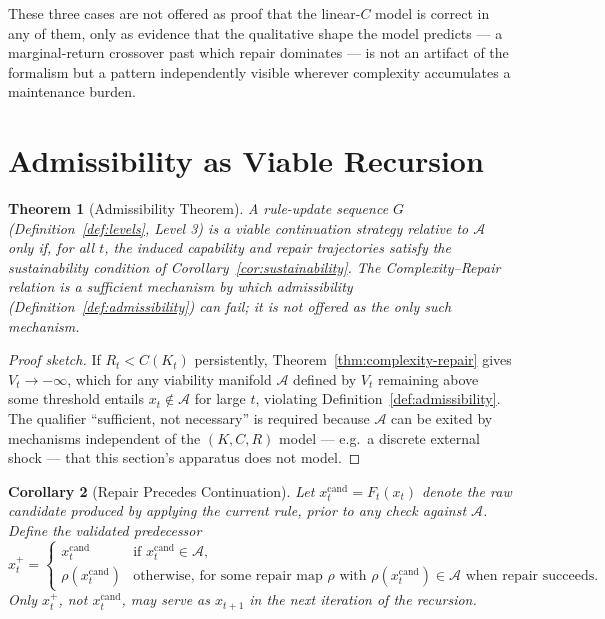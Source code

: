 \documentclass[11pt,a4paper]{article}
\theoremstyle{plain}
\newtheorem{theorem}{Theorem}[section]
\newtheorem{corollary}[theorem]{Corollary}
\theoremstyle{definition}
\theoremstyle{remark}
\newcommand{\Adm}{\mathcal{A}}
\begin{document}
These three cases are not offered as proof that the linear-$C$ model is correct in any of them, only as evidence that the qualitative shape the model predicts — a marginal-return crossover past which repair dominates — is not an artifact of the formalism but a pattern independently visible wherever complexity accumulates a maintenance burden.

\section{Admissibility as Viable Recursion}
\label{sec:admissibility-viable}

\begin{theorem}[Admissibility Theorem]
\label{thm:admissibility}
A rule-update sequence $G$ (Definition~\ref{def:levels}, Level 3) is a viable continuation strategy relative to $\Adm$ only if, for all $t$, the induced capability and repair trajectories satisfy the sustainability condition of Corollary~\ref{cor:sustainability}. The Complexity--Repair relation is a sufficient mechanism by which admissibility (Definition~\ref{def:admissibility}) can fail; it is not offered as the only such mechanism.
\end{theorem}

\begin{proof}[Proof sketch]
If $R_t < C(K_t)$ persistently, Theorem~\ref{thm:complexity-repair} gives $V_t \to -\infty$, which for any viability manifold $\Adm$ defined by $V_t$ remaining above some threshold entails $x_t \notin \Adm$ for large $t$, violating Definition~\ref{def:admissibility}. The qualifier ``sufficient, not necessary'' is required because $\Adm$ can be exited by mechanisms independent of the $(K,C,R)$ model — e.g.\ a discrete external shock — that this section's apparatus does not model.
\end{proof}

\begin{corollary}[Repair Precedes Continuation]
\label{cor:repair-precedes-continuation}
Let $x_t^{\mathrm{cand}} = F_t(x_t)$ denote the raw candidate produced by applying the current rule, prior to any check against $\Adm$. Define the \emph{validated predecessor}
\[
x_t^{+} =
\begin{cases}
x_t^{\mathrm{cand}} & \text{if } x_t^{\mathrm{cand}} \in \Adm, \\
\rho(x_t^{\mathrm{cand}}) & \text{otherwise, for some repair map } \rho \text{ with } \rho(x_t^{\mathrm{cand}}) \in \Adm \text{ when repair succeeds.}
\end{cases}
\]
Only $x_t^{+}$, not $x_t^{\mathrm{cand}}$, may serve as $x_{t+1}$ in the next iteration of the recursion.
\end{corollary}
\end{document}
